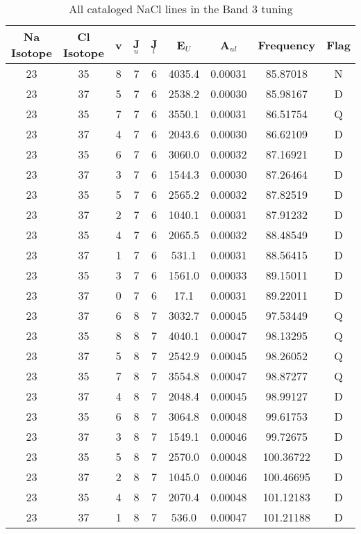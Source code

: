 \begin{table*}[htp]
\centering
\caption{All cataloged NaCl lines in the Band 3 tuning}
\begin{tabular}{ccccccccc}
\label{tab:Na_detections_B3}
Na Isotope & Cl Isotope & v & J$_u$ & J$_l$ & E$_U$ & A$_{ul}$ & Frequency & Flag \\
\hline
23 & 35 & 8 & 7 & 6 & 4035.4 & 0.00031 & 85.87018 & N \\
23 & 37 & 5 & 7 & 6 & 2538.2 & 0.00030 & 85.98167 & D \\
23 & 35 & 7 & 7 & 6 & 3550.1 & 0.00031 & 86.51754 & Q \\
23 & 37 & 4 & 7 & 6 & 2043.6 & 0.00030 & 86.62109 & D \\
23 & 35 & 6 & 7 & 6 & 3060.0 & 0.00032 & 87.16921 & D \\
23 & 37 & 3 & 7 & 6 & 1544.3 & 0.00030 & 87.26464 & D \\
23 & 35 & 5 & 7 & 6 & 2565.2 & 0.00032 & 87.82519 & D \\
23 & 37 & 2 & 7 & 6 & 1040.1 & 0.00031 & 87.91232 & D \\
23 & 35 & 4 & 7 & 6 & 2065.5 & 0.00032 & 88.48549 & D \\
23 & 37 & 1 & 7 & 6 & 531.1 & 0.00031 & 88.56415 & D \\
23 & 35 & 3 & 7 & 6 & 1561.0 & 0.00033 & 89.15011 & D \\
23 & 37 & 0 & 7 & 6 & 17.1 & 0.00031 & 89.22011 & D \\
23 & 37 & 6 & 8 & 7 & 3032.7 & 0.00045 & 97.53449 & Q \\
23 & 35 & 8 & 8 & 7 & 4040.1 & 0.00047 & 98.13295 & Q \\
23 & 37 & 5 & 8 & 7 & 2542.9 & 0.00045 & 98.26052 & Q \\
23 & 35 & 7 & 8 & 7 & 3554.8 & 0.00047 & 98.87277 & Q \\
23 & 37 & 4 & 8 & 7 & 2048.4 & 0.00045 & 98.99127 & D \\
23 & 35 & 6 & 8 & 7 & 3064.8 & 0.00048 & 99.61753 & D \\
23 & 37 & 3 & 8 & 7 & 1549.1 & 0.00046 & 99.72675 & D \\
23 & 35 & 5 & 8 & 7 & 2570.0 & 0.00048 & 100.36722 & D \\
23 & 37 & 2 & 8 & 7 & 1045.0 & 0.00046 & 100.46695 & D \\
23 & 35 & 4 & 8 & 7 & 2070.4 & 0.00048 & 101.12183 & D \\
23 & 37 & 1 & 8 & 7 & 536.0 & 0.00047 & 101.21188 & D \\
\hline
\end{tabular}

\par 
\end{table*}
